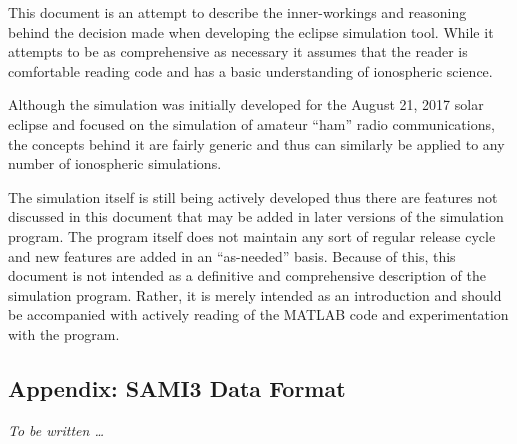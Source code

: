 \documentclass[12pt,letterpaper]{article}
\begin{document}
This document is an attempt to describe the inner-workings and reasoning behind
the decision made when developing the eclipse simulation tool. While it attempts
to be as comprehensive as necessary it assumes that the reader is comfortable
reading code and has a basic understanding of ionospheric science.

Although the simulation was initially developed for the August 21, 2017 solar
eclipse and focused on the simulation of amateur ``ham'' radio communications,
the concepts behind it are fairly generic and thus can similarly be applied to
any number of ionospheric simulations.

The simulation itself is still being actively developed thus there are features
not discussed in this document that may be added in later versions of the
simulation program. The program itself does not maintain any sort of regular
release cycle and new features are added in an ``as-needed'' basis. Because of
this, this document is not intended as a definitive and comprehensive
description of the simulation program. Rather, it is merely intended as an
introduction and should be accompanied with actively reading of the MATLAB code
and experimentation with the program.

%
%
\pagebreak
\renewcommand{\bibname}{References}



\newpage
\begin{appendices}
  
  \section{Appendix: SAMI3 Data Format}
  \label{sec:sami3_df}

  {\it To be written \dots}

\end{appendices}
\end{document}
